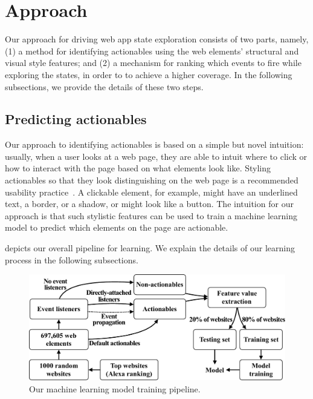 
\section{Approach}
\label{sec:approach}

Our approach for driving web app state exploration consists of two parts, namely, 
(1) a method for identifying actionables
using the web elements' structural and visual style features; and 
(2) a mechanism for ranking which events to fire
while exploring the states,  in order to to achieve a higher coverage.
In the following subsections,
we provide the details of these two steps.

\subsection{Predicting actionables}
\label{subsec:identifying-elements}
Our approach to identifying actionables
is based on a simple but novel intuition:
usually, when a user looks at a web page,
they are able to intuit where to click or
how to interact with the page based on what elements look like.
Styling actionables so that they look distinguishing
on the web page
is a recommended usability practice~\cite{w3c-actionable-elements, bbc-actionables-usability-tips}.
A clickable element, for example, might have an underlined text,
a border, or a shadow,
or might look like a button.
The intuition for our approach is that such stylistic
features can be used to train a machine learning model
to predict which elements on the page are actionable.

 depicts our overall pipeline for learning.
We explain the details of our learning process in the following subsections.

\begin{figure}
	\centering
	\includegraphics[width=\linewidth]{figures/training-pipleline}
	\caption{Our machine learning model training pipeline.}
	\label{fig:model-training-pipeline}
\end{figure}

